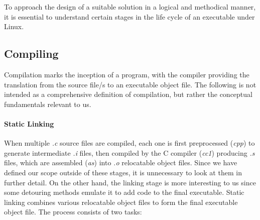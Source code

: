 To approach the design of a suitable solution in a logical and methodical manner, it is essential to understand certain stages in the life cycle of an executable under Linux. 

\subsection{Compiling}
Compilation marks the inception of a program, with the compiler providing the translation from the source file/s to an executable object file. The following is not intended as a comprehensive definition of compilation, but rather the conceptual fundamentals relevant to us.

\paragraph{Static Linking}
When multiple \emph{.c} source files are compiled, each one is first preprocessed (\emph{cpp}) to generate intermediate \emph{.i} files, then compiled by the C compiler (\emph{cc1}) producing \emph{.s} files, which are assembled (\emph{as}) into \emph{.o} relocatable object files. Since we have defined our scope outside of these stages, it is unnecessary to look at them in further detail. On the other hand, the linking stage is more interesting to us since some detouring methods emulate it to add code to the final executable. Static linking combines various relocatable object files to form the final executable object file. The process consists of two tasks\cite{computer_systems}:

